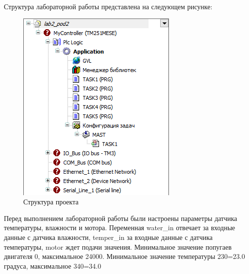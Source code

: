 \documentclass[a4paper, 16pt]{article}
\begin{document}
    \noindent Структура лабораторной работы представлена на следующем рисунке:
    \begin{figure}[h!]
        \centering
        \includegraphics[scale=0.8]{structr.png}
        \captionsetup{skip=0pt}
        \caption{Структура проекта}
        \label{Рис:3}
    \end{figure}


    \noindent Перед выполнением лабораторной работы были настроены параметры датчика температуры, влажности и мотора. Переменная
    water\_{in} отвечает за входные данные с датчика влажности, temper\_{in} за входные данные с датчика температуры, motor ждет подачи значения.
    Минимальное значение попугаев двигателя 0, максимальное 24000. Минимальное значение температуры 230=23.0 градуса, максимальное 340=34.0


    \newpage
\end{document}
